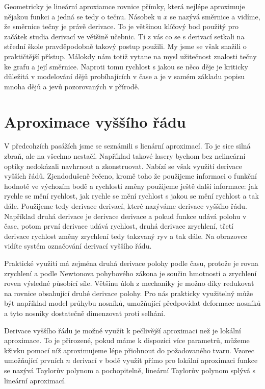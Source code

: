 \documentclass[12pt]{article}
\begin{document}
Geometricky je lineární aproxiamce rovnice přímky, která nejlépe aproximuje nějakou funkci a jedná se tedy o tečnu. Násobek u $x$ se nazývá směrnice a vidíme, že směrnice tečny je právě derivace. To je většinou klíčový bod použitý pro začátek studia derivací ve většině učebnic. Ti z vás co se s derivací setkali na střední škole pravděpodobně takový postup použili. My jsme se však snažili o praktičtější přístup. Málokdy nám totiž vytane na mysl užitečnost znalosti tečny ke grafu a její směrnice. Naproti tomu rychlost s jakou se něco děje je kriticky důležitá v modelování dějů probíhajících v čase a je v samém základu popisu mnoha dějů a jevů pozorovaných v přírodě.

\section*{Aproximace vyššího řádu}

V předcohzích pasážích jsme se seznámili s lienární aproximací. To je sice silná zbraň, ale na všechno nestačí. Například takové lasery bychom bez nelineární optiky nedokázali navhrnout a zkonstruovat. Nabízí se však využití derivace vyšších řádů. Zjendodušeně řečeno, kromě toho že použijeme informaci o funkční hodnotě ve výchozím bodě a rychlosti změny použijeme ještě další informace: jak rychle se mění rychlost, jak rychle se mění rychlost s jakou se mění rychlost a tak dále. Použijeme tedy derivace derivací, které nazýváme derivace vyššího řádu. Například druhá derivace je derivace derivace a pokud funkce udává polohu v čase, potom první derivace udává rychlost, druhá derivace zrychlení, třetí derivace rychlost změny zrychlení tedy takzvaný ryv a tak dále. Na obrazovce vidíte systém označování derivací vyššího řádu.

Praktické využití má zejména druhá derivace polohy podle času, protože je rovna zrychlení a podle Newtonova pohybového zákona je součin hmotnosti a zrychlení roven výsledné působící síle. Většinu úloh z mechaniky je možno díky redukovat na rovnice obsahující druhé derivace polohy. Pro nás prakticky využitelný může být například model průhybu nosníků, umožňující předpovídat deformace nosníků a tyto nosníky dostatečně dimenzovat proti selhání.  

Derivace vyššího řádu je možné využít k pečlivější aproximaci než je lokální aproximace. To je přirozené, pokud máme k dispozici více parametrů, můžeme kživku pomocí níž aproximujeme lépe přiohnout do požadovaného tvaru. Vzorec umožňující prvních $n$ derivací v bodě využít přímo pro lokální aproximaci funkce se nazývá Taylorův polynom a pochopitelně, lineární Taylorův polynom splývá s lineární aproximací.
\end{document}

